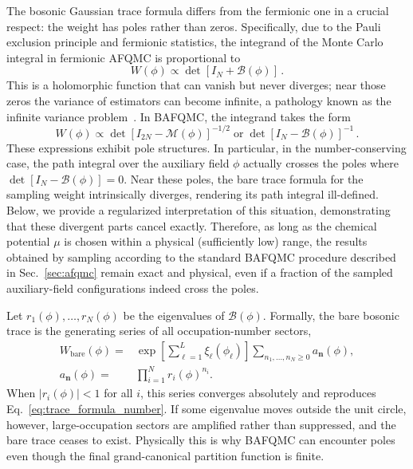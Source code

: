 \documentclass[twocolumn,aps,prb,10pt,amsmath,amssymb,amsthm,superscriptaddress]{revtex4-2}
\newcommand{\mc}[1]{\mathcal{#1}}
\newcommand{\bb}[1]{\bm{#1}}
\theoremstyle{remark}
\begin{document}
The bosonic Gaussian trace formula differs from the fermionic one in a crucial respect: the weight has poles rather than zeros. Specifically, due to the Pauli exclusion principle and fermionic statistics, the integrand of the Monte Carlo integral in fermionic AFQMC is proportional to
\begin{equation}
    W(\phi)\propto \det\left[I_N+\mc B(\phi)\right]\,.
\end{equation}
This is a holomorphic function that can vanish but never diverges; near those zeros the variance of estimators can become infinite, a pathology known as the infinite variance problem~\cite{alexandru2023prd,wan2025infinite}. In BAFQMC, the integrand takes the form
\begin{equation}
    W(\phi)\propto\det\left[I_{2N}-\mc M(\phi)\right]^{-1/2}
    \;\text{or}\;
    \det\left[I_{N}-\mc B(\phi)\right]^{-1} \,.
\end{equation}
These expressions exhibit pole structures. In particular, in the number-conserving case, the path integral over the auxiliary field $\phi$ actually crosses the poles where $\det\left[I_{N}-\mc B(\phi)\right]=0$. Near these poles, the bare trace formula for the sampling weight intrinsically diverges, rendering its path integral ill-defined. Below, we provide a regularized interpretation of this situation, demonstrating that these divergent parts cancel exactly. Therefore, as long as the chemical potential $\mu$ is chosen within a physical (sufficiently low) range, the results obtained by sampling according to the standard BAFQMC procedure described in Sec.~\ref{sec:afqmc} remain exact and physical, even if a fraction of the sampled auxiliary-field configurations indeed cross the poles.

Let $r_1(\phi),\dots,r_N(\phi)$ be the eigenvalues of $\mc B(\phi)$. Formally, the bare bosonic trace is the generating series of all occupation-number sectors,
\begin{equation}
\begin{aligned}
    W_{\mathrm{bare}}(\phi)
    =& \exp\!\left[\sum_{\ell=1}^{L}\xi_\ell(\phi_\ell)\right]
    \sum_{n_1,\dots,n_N\ge0} a_{\bb n}(\phi), \\
    a_{\bb n}(\phi)={}& \prod_{i=1}^{N} r_i(\phi)^{n_i}.
\end{aligned}
\end{equation}
When $|r_i(\phi)|<1$ for all $i$, this series converges absolutely and reproduces Eq.~\eqref{eq:trace_formula_number}. If some eigenvalue moves outside the unit circle, however, large-occupation sectors are amplified rather than suppressed, and the bare trace ceases to exist. Physically this is why BAFQMC can encounter poles even though the final grand-canonical partition function is finite.
\end{document}
